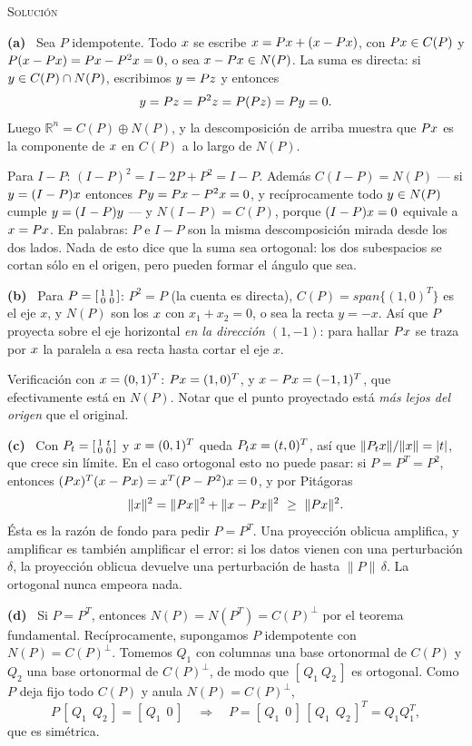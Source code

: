 \documentclass[11pt,a4paper]{article}
\newcommand{\bi}[1]{\boldsymbol{#1}}
\newcommand{\n}[1]{\boldsymbol{#1}}
\newcommand{\R}{\mathbb{R}}
\DeclareMathOperator{\gen}{span}
\DeclareMathOperator{\tr}{tr}
\DeclareMathOperator{\rg}{rg}
\def\n#1{#1}\def\bi#1{#1}\def\rg{rg}\def\tr{tr}\def\gen{span}%
\newcommand{\solucion}{\par\medskip\noindent\textsc{Solución}\par\nobreak\smallskip\noindent}
\newcommand{\itemsol}[1]{\par\medskip\noindent\textbf{(#1)}\ \ignorespaces}
\begin{document}
\solucion
\itemsol{a} Sea $P$ idempotente. Todo $\bx$ se escribe $\bx=P\bx+(\bx-P\bx)$,
con $P\bx\in C(P)$ y $P(\bx-P\bx)=P\bx-P^2\bx=\n0$, o sea $\bx-P\bx\in N(P)$. La
suma es directa: si $\by\in C(P)\cap N(P)$, escribimos $\by=P\bz$ y entonces
\[
\by=P\bz=P^2\bz=P(P\bz)=P\by=\n0 .
\]
Luego $\R^n=C(P)\oplus N(P)$, y la descomposición de arriba muestra que $P\bx$
es la componente de $\bx$ en $C(P)$ a lo largo de $N(P)$.

Para $I-P$: $(I-P)^2=I-2P+P^2=I-P$. Además $C(I-P)=N(P)$ --- si
$\by=(I-P)\bx$ entonces $P\by=P\bx-P^2\bx=\n0$, y recíprocamente todo
$\by\in N(P)$ cumple $\by=(I-P)\by$ --- y $N(I-P)=C(P)$, porque $(I-P)\bx=\n0$
equivale a $\bx=P\bx$. En palabras: $P$ e $I-P$ son la misma descomposición
mirada desde los dos lados. Nada de esto dice que la suma sea ortogonal: los dos
subespacios se cortan sólo en el origen, pero pueden formar el ángulo que sea.

\itemsol{b} Para $P=\begin{bsmallmatrix}1&1\\0&0\end{bsmallmatrix}$: $P^2=P$
(la cuenta es directa), $C(P)=\gen\{(1,0)^T\}$ es el eje $x$, y $N(P)$ son los
$\bx$ con $x_1+x_2=0$, o sea la recta $y=-x$. Así que $P$ proyecta sobre el eje
horizontal \emph{en la dirección $(1,-1)$}: para hallar $P\bx$ se traza por
$\bx$ la paralela a esa recta hasta cortar el eje $x$.

Verificación con $\bx=(0,1)^T$: $P\bx=(1,0)^T$, y $\bx-P\bx=(-1,1)^T$, que
efectivamente está en $N(P)$. Notar que el punto proyectado está \emph{más lejos
del origen} que el original.

\itemsol{c} Con $P_t=\begin{bsmallmatrix}1&t\\0&0\end{bsmallmatrix}$ y
$\bx=(0,1)^T$ queda $P_t\bx=(t,0)^T$, así que
$\|P_t\bx\|/\|\bx\|=|t|$, que crece sin límite. En el caso ortogonal esto no
puede pasar: si $P=P^T=P^2$, entonces $(P\bx)^T(\bx-P\bx)=\bx^T(P-P^2)\bx=0$, y
por Pitágoras
\[
\|\bx\|^2=\|P\bx\|^2+\|\bx-P\bx\|^2\ \ge\ \|P\bx\|^2 .
\]
Ésta es la razón de fondo para pedir $P=P^T$. Una proyección oblicua amplifica,
y amplificar es también amplificar el error: si los datos vienen con una
perturbación $\delta$, la proyección oblicua devuelve una perturbación de hasta
$\|P\|\,\delta$. La ortogonal nunca empeora nada.

\itemsol{d} Si $P=P^T$, entonces $N(P)=N(P^T)=C(P)^{\perp}$ por el teorema
fundamental. Recíprocamente, supongamos $P$ idempotente con
$N(P)=C(P)^{\perp}$. Tomemos $Q_1$ con columnas una base ortonormal de $C(P)$ y
$Q_2$ una base ortonormal de $C(P)^{\perp}$, de modo que $[\,Q_1\ Q_2\,]$ es
ortogonal. Como $P$ deja fijo todo $C(P)$ y anula $N(P)=C(P)^{\perp}$,
\[
P\,[\,Q_1\ \ Q_2\,]=[\,Q_1\ \ 0\,]
\quad\Longrightarrow\quad
P=[\,Q_1\ \ 0\,]\,[\,Q_1\ \ Q_2\,]^T=Q_1Q_1^T,
\]
que es simétrica.
\end{document}
